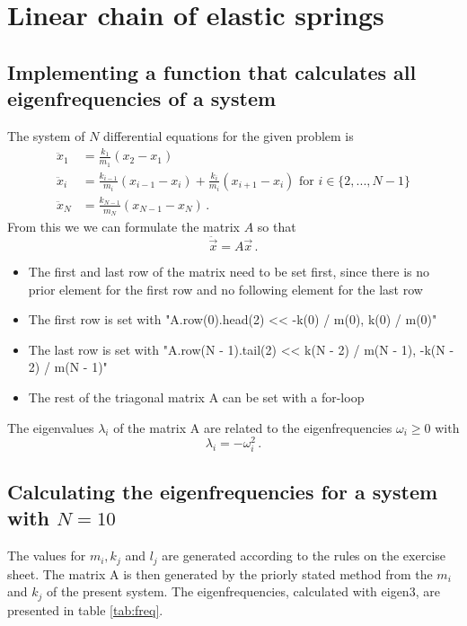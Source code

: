 \section{Linear chain of elastic springs}

\subsection{Implementing a function that calculates all eigenfrequencies of a system}
The system of $N$ differential equations for the given problem is 
\begin{align}
\ddot{x}_{1} &= \frac{k_1}{m_1}(x_2 - x_1) \\
\ddot{x}_i &= \frac{k_{i-1}}{m_i}(x_{i-1} - x_i) + \frac{k_i}{m_i}(x_{i+1}-x_i) \text{ for } i \in \{2,...,N-1\} \\
\ddot{x}_{N} &= \frac{k_{N-1}}{m_N}(x_{N-1} - x_{N}) \, .
\end{align}
From this we we can formulate the matrix $A$ so that 
\begin{equation}
    \ddot{\vec{x}} = A \vec{x} \, .
\end{equation}
\begin{itemize}
\item The first and last row of the matrix need to be set first, since there is no prior element for the first row and no following element for the last row 
\item The first row is set with "A.row(0).head(2) << -k(0) / m(0), k(0) / m(0)"
\item The last row is set with "A.row(N - 1).tail(2) << k(N - 2) / m(N - 1), -k(N - 2) / m(N - 1)"
\item The rest of the triagonal matrix A can be set with a for-loop
\end{itemize}
The eigenvalues $\lambda_i$ of the matrix A are related to the eigenfrequencies $\omega_i \geq 0$ with
\begin{equation}
    \lambda_i = - \omega_i^2 \, .
\end{equation}

\subsection{Calculating the eigenfrequencies for a system with $N=10$}

The values for $m_i,k_j$ and $l_j$ are generated according to the rules on the exercise sheet.
The matrix A is then generated by the priorly stated method from the $m_i$ and $k_j$ of the present system.
The eigenfrequencies, calculated with eigen3, are presented in table \ref{tab:freq}.

